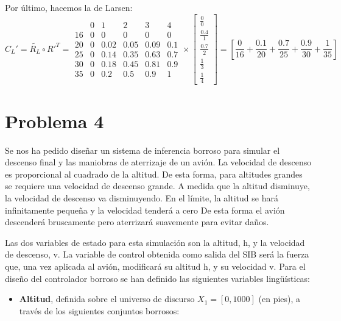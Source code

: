 \documentclass[
]{article}
\providecommand{\tightlist}{%
  \setlength{\itemsep}{0pt}\setlength{\parskip}{0pt}}
\begin{document}
Por último, hacemos la de Larsen:
\[C_{L}'=\widetilde{R_{L}}\circ R'^{T}=\begin{array}{cccccc}
 & 0 & 1 & 2 & 3 & 4\\
16 & 0 & 0 & 0 & 0 & 0\\
20 & 0 & 0.02 & 0.05 & 0.09 & 0.1\\
25 & 0 & 0.14 & 0.35 & 0.63 & 0.7\\
30 & 0 & 0.18 & 0.45 & 0.81 & 0.9\\
35 & 0 & 0.2 & 0.5 & 0.9 & 1
\end{array}\times\left[\begin{array}{c}
\frac{0}{0}\\
\frac{0.4}{1}\\
\frac{0.7}{2}\\
\frac{1}{3}\\
\frac{1}{4}
\end{array}\right]=\left[\frac{0}{16}+\frac{0.1}{20}+\frac{0.7}{25}+\frac{0.9}{30}+\frac{1}{35}\right]\]

\newpage

\hypertarget{problema-4}{%
\section{Problema 4}\label{problema-4}}

Se nos ha pedido diseñar un sistema de inferencia borroso para simular
el descenso final y las maniobras de aterrizaje de un avión. La
velocidad de descenso es proporcional al cuadrado de la altitud. De esta
forma, para altitudes grandes se requiere una velocidad de descenso
grande. A medida que la altitud disminuye, la velocidad de descenso va
disminuyendo. En el límite, la altitud se hará infinitamente pequeña y
la velocidad tenderá a cero De esta forma el avión descenderá
bruscamente pero aterrizará suavemente para evitar daños.

Las dos variables de estado para esta simulación son la altitud, h, y la
velocidad de descenso, v. La variable de control obtenida como salida
del SIB será la fuerza que, una vez aplicada al avión, modificará su
altitud h, y su velocidad v. Para el diseño del controlador borroso se
han definido las siguientes variables lingüísticas:

\begin{itemize}
\tightlist
\item
  \textbf{Altitud}, definida sobre el universo de discurso
  \(X_{1}=\left[0,1000\right]\) (en pies), a través de los siguientes
  conjuntos borrosos:
\end{itemize}
\end{document}
